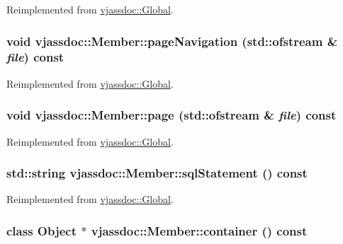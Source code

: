 Reimplemented from \hyperlink{classvjassdoc_1_1Global_9e6189cfd577f0453988e8c8c6eec04d}{vjassdoc::Global}.\hypertarget{classvjassdoc_1_1Member_fa8e020175714b1f03a3696cc935941f}{
\subsubsection{\setlength{\rightskip}{0pt plus 5cm}void vjassdoc::Member::pageNavigation (std::ofstream \& {\em file}) const}}
\label{classvjassdoc_1_1Member_fa8e020175714b1f03a3696cc935941f}




Reimplemented from \hyperlink{classvjassdoc_1_1Global_8c5209b5652d3633feb1d7fab796b439}{vjassdoc::Global}.\hypertarget{classvjassdoc_1_1Member_2bd66eba1882dfb2dcbf2552b42d1346}{
\subsubsection{\setlength{\rightskip}{0pt plus 5cm}void vjassdoc::Member::page (std::ofstream \& {\em file}) const}}
\label{classvjassdoc_1_1Member_2bd66eba1882dfb2dcbf2552b42d1346}




Reimplemented from \hyperlink{classvjassdoc_1_1Global_1b8fefe2b9c895c122a822bac0383f1b}{vjassdoc::Global}.\hypertarget{classvjassdoc_1_1Member_ad210521f998bd4c8be5f8af3ae74cf1}{
\subsubsection{\setlength{\rightskip}{0pt plus 5cm}std::string vjassdoc::Member::sqlStatement () const}}
\label{classvjassdoc_1_1Member_ad210521f998bd4c8be5f8af3ae74cf1}




Reimplemented from \hyperlink{classvjassdoc_1_1Global_4e9a8ea0c8bc34f6980d31676e497531}{vjassdoc::Global}.\hypertarget{classvjassdoc_1_1Member_313ed6d74338700b34409ccad8dc5360}{
\subsubsection{\setlength{\rightskip}{0pt plus 5cm}class {\bf Object} $\ast$ vjassdoc::Member::container () const}}
\label{classvjassdoc_1_1Member_313ed6d74338700b34409ccad8dc5360}




